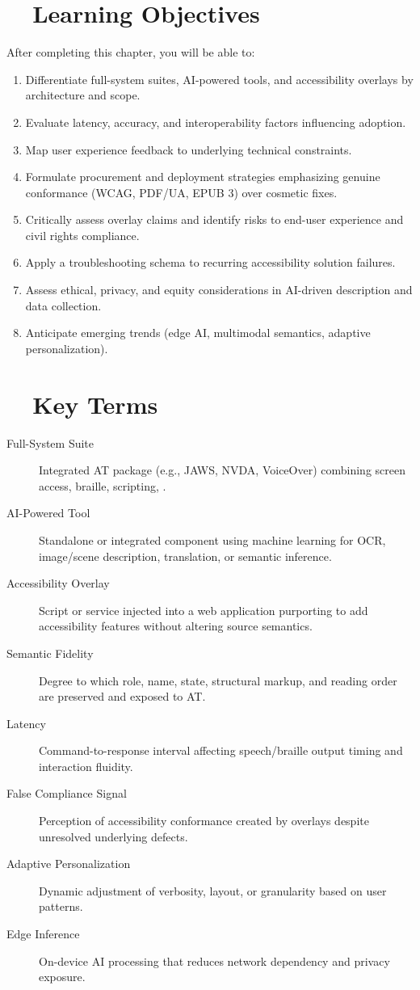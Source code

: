 \section{~~Learning Objectives}
\label{sec:ch28-learning-objectives}
After completing this chapter, you will be able to:
\begin{enumerate}
	\item Differentiate full-system suites, AI-powered tools, and accessibility overlays by architecture and scope.
	\item Evaluate latency, accuracy, and interoperability factors influencing adoption.
	\item Map user experience feedback to underlying technical constraints.
	\item Formulate procurement and deployment strategies emphasizing genuine conformance (WCAG, PDF/UA, EPUB 3) over cosmetic fixes.
	\item Critically assess overlay claims and identify risks to end-user experience and civil rights compliance.
	\item Apply a troubleshooting schema to recurring accessibility solution failures.
	\item Assess ethical, privacy, and equity considerations in AI-driven description and data collection.
	\item Anticipate emerging trends (edge AI, multimodal semantics, adaptive personalization).
\end{enumerate}

\section{~~Key Terms}
\label{sec:ch28-key-terms}
\begin{description}
	\item[Full-System Suite] Integrated AT package (e.g., JAWS, NVDA, VoiceOver) combining screen access, braille, scripting, .
	\item[AI-Powered Tool] Standalone or integrated component using machine learning for OCR, image/scene description, translation, or semantic inference.
	\item[Accessibility Overlay] Script or service injected into a web application purporting to add accessibility features without altering source semantics.
	\item[Semantic Fidelity] Degree to which role, name, state, structural markup, and reading order are preserved and exposed to AT.
	\item[Latency] Command-to-response interval affecting speech/braille output timing and interaction fluidity.
	\item[False Compliance Signal] Perception of accessibility conformance created by overlays despite unresolved underlying defects.
	\item[Adaptive Personalization] Dynamic adjustment of verbosity, layout, or  granularity based on user patterns.
	\item[Edge Inference] On-device AI processing that reduces network dependency and privacy exposure.
\end{description}

